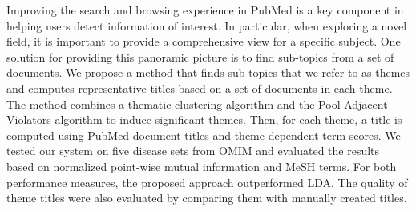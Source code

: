 Improving the search and browsing experience in PubMed is a key component in helping users detect information of interest. In particular, when exploring a novel field, it is important to provide a comprehensive view for a specific subject. One solution for providing this panoramic picture is to find sub-topics from a set of documents. We propose a method that finds sub-topics that we refer to as themes and computes representative titles based on a set of documents in each theme. The method combines a thematic clustering algorithm and the Pool Adjacent Violators algorithm to induce significant themes. Then, for each theme, a title is computed using PubMed document titles and theme-dependent term scores. We tested our system on five disease sets from OMIM and evaluated the results based on normalized point-wise mutual information and MeSH terms. For both performance measures, the proposed approach outperformed LDA. The quality of theme titles were also evaluated by comparing them with manually created titles.
